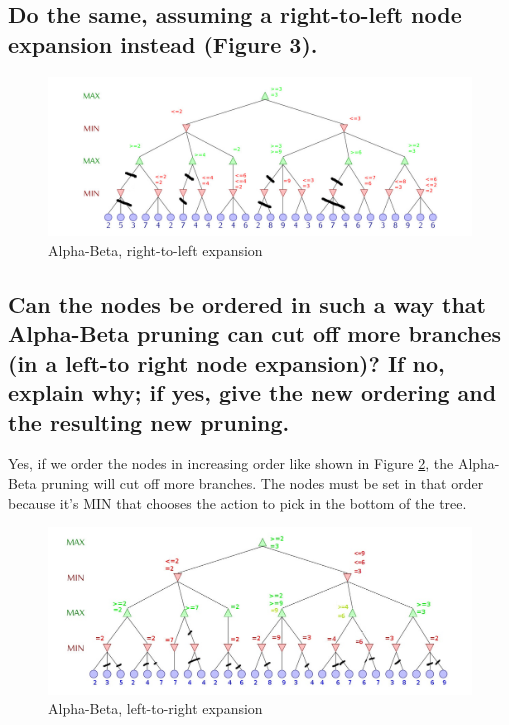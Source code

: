 \documentclass[10pt,a4paper]{article}
\begin{document}
\subsection{Do the same, assuming a right-to-left node expansion instead (Figure 3).}

\begin{figure}[h]
\includegraphics[scale=0.4]{img/alphabeta_right.jpg} 
\caption{\label{alphabetaright} Alpha-Beta, right-to-left expansion}
\end{figure}

\subsection{Can the nodes be ordered in such a way that Alpha-Beta pruning can cut off more branches (in a left-to right node expansion)? If no, explain why; if yes, give the new ordering and the resulting new pruning.}

Yes, if we order the nodes in increasing order like shown in Figure \ref{alphabetanodes}, the Alpha-Beta pruning will cut off more branches. The nodes must be set in that order because it's MIN that chooses the action to pick in the bottom of the tree.


\begin{figure}[h]
\includegraphics[scale=0.4]{img/alphabeta_nodes.jpg} 
\caption{\label{alphabetanodes} Alpha-Beta, left-to-right expansion}
\end{figure}
\end{document}
